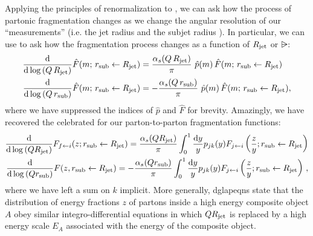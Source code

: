 


Applying the principles of renormalization to , we can ask how the process of partonic fragmentation changes as we change the angular resolution of our ``measurements'' (i.e. the jet radius \Rjet{} and the subjet radius \rsub{}).
%
In particular, we can use  to ask how the fragmentation process changes as a function of \(R_\text{jet}\) or \(\rsub\):
\begin{subequations}
\begin{align}
    \label{eq:fragmentation_dglap_upper}
    \frac{\dd}{\dd\log\le(Q\,\Rjet\ri)} \hat{F}(m;\,\rsub\leftarrow \Rjet)
    &=
    \frac{\alpha_s(Q\,\Rjet)}{\pi}
    \,\,
    \hat{p}(m)
    \,
    \hat{F}(m;\,\rsub\leftarrow \Rjet)
    \\
    \label{eq:fragmentation_dglap_lower}
    \frac{\dd}{\dd\log\le(Q\,\rsub\ri)} \hat{F}(m;\,\rsub\leftarrow \Rjet)
    &=
    -\frac{\alpha_s(Q\,\rsub)}{\pi}
    \,\,
    \hat{p}(m)
    \,
    \hat{F}(m;\,\rsub\leftarrow \Rjet)
    ,
\end{align}
\end{subequations}
where we have suppressed the indices of \(\hat{p}\) and \(\hat{F}\) for brevity.
%
Amazingly, we have recovered the celebrated  \cite{Gribov:1972ri,Dokshitzer:1977sg,Altarelli:1977zs} for our parton-to-parton fragmentation functions:
\begin{subequations}
\label{eq:dglap-equations-parton-shower}
\begin{align}
    \frac{\dd}{\dd\log\left(Q R_\text{jet}\right)}
    F_{f\leftarrow i}(z; r_\text{sub} \leftarrow R_\text{jet})
    =
    \frac{\alpha_s(QR_\text{jet})}{\pi}
    \int_0^1
    \frac{\dd y}{y}
    p_{j k}(y)
    F_{j\leftarrow i}\left(\frac{z}{y}; r_\text{sub} \leftarrow R_\text{jet}\right)
    \\
    \frac{\dd}{\dd\log\left(Q r_\text{sub}\right)}
    F(z, r_\text{sub} \leftarrow R_\text{jet})
    =
    -
    \frac{\alpha_s(Qr_\text{sub})}{\pi}
    \int_0^1
    \frac{\dd y}{y}
    p_{j k}(y)
    F_{j\leftarrow i}\left(\frac{z}{y}; r_\text{sub} \leftarrow R_\text{jet}\right)
    \,,
\end{align}
\end{subequations}
where we have left a sum on \(k\) implicit.
%
More generally, \glspl{dglapeqn} state that the distribution of energy fractions \(z\) of partons inside a high energy composite object \(A\) obey similar integro-differential equations in which \(QR_\text{jet}\) is replaced by a high energy scale \(E_A\) associated with the energy of the composite object.


